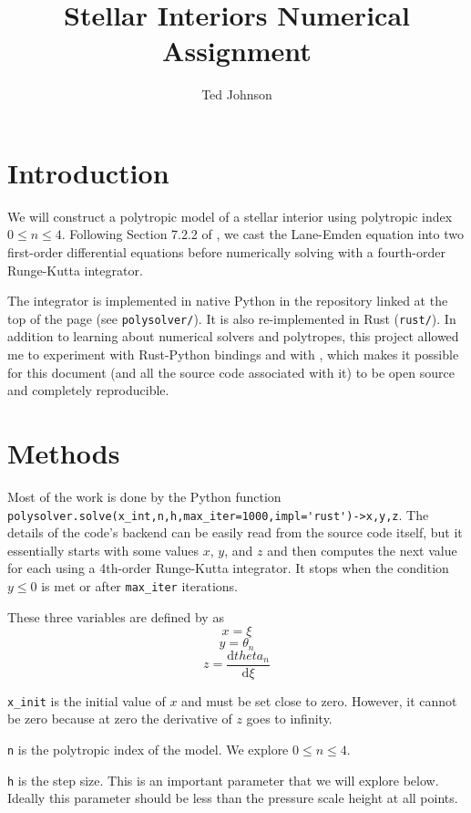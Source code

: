 \documentclass[twocolumn]{aastex631}
\begin{document}
\title{Stellar Interiors Numerical Assignment}

\author{Ted Johnson}


\section{Introduction}
\label{sec:intro}

We will construct a polytropic model of a stellar interior using
polytropic index $0\le n \le 4$. Following Section 7.2.2 of
\citet{textbook}, we cast the Lane-Emden equation into two
first-order differential equations before numerically solving
with a fourth-order Runge-Kutta integrator.

The integrator is implemented in native Python in the repository
linked at the top of the page (see \texttt{polysolver/}). It is
also re-implemented in Rust (\texttt{rust/}). In addition to
learning about numerical solvers and polytropes, this project
allowed me to experiment with Rust-Python bindings and with
\showyourwork, which makes it possible for this document (and
all the source code associated with it) to be open source and completely
reproducible.


\section{Methods}
\label{sec:methods}
Most of the work is done by the Python function
\verb|polysolver.solve(x_int,n,h,max_iter=1000,impl='rust')->x,y,z|.
The details of the code's backend can be easily read from
the source code itself, but it essentially starts with some
values $x$, $y$, and $z$ and then computes the next value for
each using a 4th-order Runge-Kutta integrator. It stops when
the condition $y \le 0$ is met or after \texttt{max\_iter} iterations.

These three variables are defined by \citet{textbook} as
\[ x = \xi\]
\[y = \theta_n\]
\[z = \frac{\text{d}theta_n}{\text{d}\xi}\]

\texttt{x\_init} is the initial value of $x$ and must be set close to zero.
However, it cannot be zero because at zero the derivative of $z$ goes to infinity.

\texttt{n} is the polytropic index of the model. We explore
$0\le n \le 4$.

\texttt{h} is the step size. This is an important parameter that we will
explore below. Ideally this parameter should be less than
the pressure scale height at all points.
\end{document}
